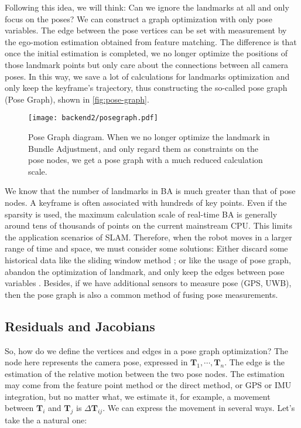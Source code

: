 Following this idea, we will think: Can we ignore the landmarks at all and only focus on the poses? We can construct a graph optimization with only pose variables. The edge between the pose vertices can be set with measurement by the ego-motion estimation obtained from feature matching. The difference is that once the initial estimation is completed, we no longer optimize the positions of those landmark points but only care about the connections between all camera poses. In this way, we save a lot of calculations for landmarks optimization and only keep the keyframe's trajectory, thus constructing the so-called pose graph (Pose Graph), shown in \autoref{fig:pose-graph}.

\begin{figure}[!ht]
	\centering
	\texttt{[image: backend2/posegraph.pdf]}
	\caption{Pose Graph diagram. When we no longer optimize the landmark in Bundle Adjustment, and only regard them as constraints on the pose nodes, we get a pose graph with a much reduced calculation scale.}
	\label{fig:pose-graph}
\end{figure}

We know that the number of landmarks in BA is much greater than that of pose nodes. A keyframe is often associated with hundreds of key points. Even if the sparsity is used, the maximum calculation scale of real-time BA is generally around tens of thousands of points on the current mainstream CPU. This limits the application scenarios of SLAM. Therefore, when the robot moves in a larger range of time and space, we must consider some solutions: Either discard some historical data like the sliding window method {\cite{Strasdat2011}}; or like the usage of pose graph, abandon the optimization of landmark, and only keep the edges between pose variables {\cite{Dubbelman2015, Lee2014, Latif2013}}. Besides, if we have additional sensors to measure pose (GPS, UWB), then the pose graph is also a common method of fusing pose measurements.

\subsection{Residuals and Jacobians}
So, how do we define the vertices and edges in a pose graph optimization? The node here represents the camera pose, expressed in $\bm{T}_1, \cdots, \bm{T}_n$. The edge is the estimation of the relative motion between the two pose nodes. The estimation may come from the feature point method or the direct method, or GPS or IMU integration, but no matter what, we estimate it, for example, a movement between $\bm{T}_i$ and $\bm{T}_j$ is $\Delta \bm{T}_{ij}$. We can express the movement in several ways. Let's take the a natural one:

